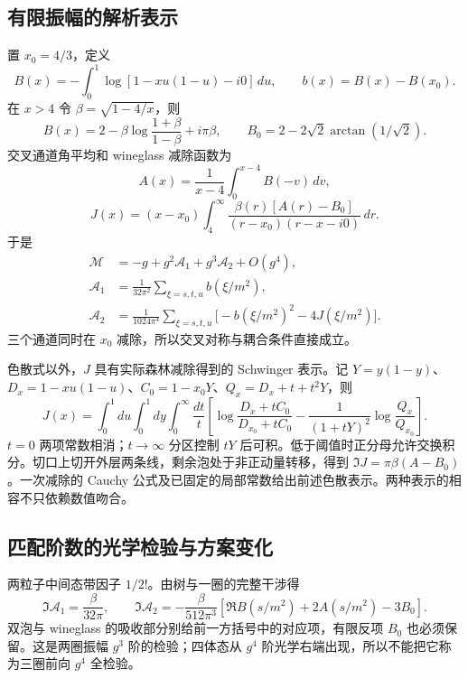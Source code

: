 \documentclass[11pt,a4paper,oneside]{ctexart}
\theoremstyle{cnplain}
\theoremstyle{definition}
\theoremstyle{remark}
\numberwithin{equation}{section}
\begin{document}
\subsection{有限振幅的解析表示}
置 $x_0=4/3$，定义
\begin{equation}
 B(x)=-\int_0^1\log[1-xu(1-u)-i0]\,du,\qquad b(x)=B(x)-B(x_0).
\end{equation}
在 $x>4$ 令 $\beta=\sqrt{1-4/x}$，则
\begin{equation}
 B(x)=2-\beta\log\frac{1+\beta}{1-\beta}+i\pi\beta,\qquad
 B_0=2-2\sqrt2\arctan(1/\sqrt2).
\end{equation}
交叉通道角平均和 wineglass 减除函数为
\begin{equation}
 A(x)=\frac1{x-4}\int_0^{x-4}B(-v)\,dv,
\end{equation}
\begin{equation}
 J(x)=(x-x_0)\int_4^\infty
 \frac{\beta(r)[A(r)-B_0]}{(r-x_0)(r-x-i0)}\,dr.
\end{equation}
于是
\begin{equation}
\begin{aligned}
 \mathcal M&=-g+g^2\mathcal A_1+g^3\mathcal A_2+O(g^4),\\
 \mathcal A_1&=\frac1{32\pi^2}\sum_{\xi=s,t,u}b(\xi/m^2),\\
 \mathcal A_2&=\frac1{1024\pi^4}\sum_{\xi=s,t,u}
 \bigl[-b(\xi/m^2)^2-4J(\xi/m^2)\bigr].
\end{aligned}
\end{equation}
三个通道同时在 $x_0$ 减除，所以交叉对称与耦合条件直接成立。

色散式以外，$J$ 具有实际森林减除得到的 Schwinger 表示。记 $Y=y(1-y)$、$D_x=1-xu(1-u)$、$C_0=1-x_0Y$、$Q_x=D_x+t+t^2Y$，则
\begin{equation}
 J(x)=\int_0^1du\int_0^1dy\int_0^\infty\frac{dt}{t}
 \left[\log\frac{D_x+tC_0}{D_{x_0}+tC_0}
 -\frac1{(1+tY)^2}\log\frac{Q_x}{Q_{x_0}}\right].
\end{equation}
$t=0$ 两项常数相消；$t\to\infty$ 分区控制 $tY$ 后可积。低于阈值时正分母允许交换积分。切口上切开外层两条线，剩余泡处于非正动量转移，得到 $\Im J=\pi\beta(A-B_0)$。一次减除的 Cauchy 公式及已固定的局部常数给出前述色散表示。两种表示的相容不只依赖数值吻合。


\subsection{匹配阶数的光学检验与方案变化}
两粒子中间态带因子 $1/2!$。由树与一圈的完整干涉得
\begin{equation}
 \Im\mathcal A_1=\frac{\beta}{32\pi},\qquad
 \Im\mathcal A_2=-\frac{\beta}{512\pi^3}
 [\Re B(s/m^2)+2A(s/m^2)-3B_0].
\end{equation}
双泡与 wineglass 的吸收部分别给前一方括号中的对应项，有限反项 $B_0$ 也必须保留。这是两圈振幅 $g^3$ 阶的检验；四体态从 $g^4$ 阶光学右端出现，所以不能把它称为三圈前向 $g^4$ 全检验。
\end{document}
